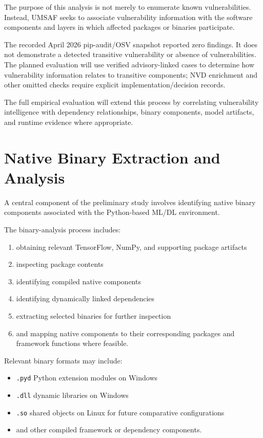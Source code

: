 \documentclass[
  12pt,
  letterpaper,
  oneside]{report}
\providecommand{\tightlist}{%
  \setlength{\itemsep}{0pt}\setlength{\parskip}{0pt}}
\begin{document}
The purpose of this analysis is not merely to enumerate known
vulnerabilities. Instead, UMSAF seeks to associate vulnerability
information with the software components and layers in which affected
packages or binaries participate.

The recorded April 2026 pip-audit/OSV snapshot reported zero findings.
It does not demonstrate a detected transitive vulnerability or absence
of vulnerabilities. The planned evaluation will use verified
advisory-linked cases to determine how vulnerability information relates
to transitive components; NVD enrichment and other omitted checks
require explicit implementation/decision records.

The full empirical evaluation will extend this process by correlating
vulnerability intelligence with dependency relationships, binary
components, model artifacts, and runtime evidence where appropriate.

\section{Native Binary Extraction and Analysis}\label{95-native-binary-extraction-and-analysis}

A central component of the preliminary study involves identifying native
binary components associated with the Python-based ML/DL environment.

The binary-analysis process includes:

\begin{enumerate}
\def\labelenumi{\arabic{enumi}.}
\tightlist
\item
  obtaining relevant TensorFlow, NumPy, and supporting package artifacts
\item
  inspecting package contents
\item
  identifying compiled native components
\item
  identifying dynamically linked dependencies
\item
  extracting selected binaries for further inspection
\item
  and mapping native components to their corresponding packages and
  framework functions where feasible.
\end{enumerate}

Relevant binary formats may include:

\begin{itemize}
\tightlist
\item
  \texttt{.pyd} Python extension modules on Windows
\item
  \texttt{.dll} dynamic libraries on Windows
\item
  \texttt{.so} shared objects on Linux for future comparative
  configurations
\item
  and other compiled framework or dependency components.
\end{itemize}
\end{document}
